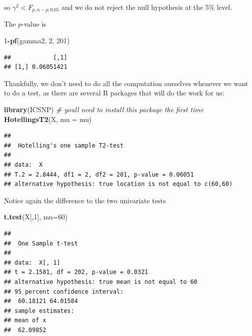\documentclass[
]{book}
\newenvironment{Shaded}{\begin{snugshade}}{\end{snugshade}}
\newcommand{\AttributeTok}[1]{\textcolor[rgb]{0.13,0.29,0.53}{#1}}
\newcommand{\CommentTok}[1]{\textcolor[rgb]{0.56,0.35,0.01}{\textit{#1}}}
\newcommand{\DecValTok}[1]{\textcolor[rgb]{0.00,0.00,0.81}{#1}}
\newcommand{\FunctionTok}[1]{\textcolor[rgb]{0.13,0.29,0.53}{\textbf{#1}}}
\newcommand{\NormalTok}[1]{#1}
\newcommand{\SpecialCharTok}[1]{\textcolor[rgb]{0.81,0.36,0.00}{\textbf{#1}}}
\theoremstyle{definition}
\theoremstyle{definition}
\theoremstyle{definition}
\theoremstyle{definition}
\theoremstyle{remark}
\begin{document}
so \(\gamma^2 < F_{p,n-p,0.05}\) and we do not reject the null hypothesis at the 5\% level.

The \(p\)-value is

\begin{Shaded}
\begin{Highlighting}[]
\DecValTok{1}\SpecialCharTok{{-}}\FunctionTok{pf}\NormalTok{(gamma2, }\DecValTok{2}\NormalTok{, }\DecValTok{201}\NormalTok{)}
\end{Highlighting}
\end{Shaded}

\begin{verbatim}
##            [,1]
## [1,] 0.06051421
\end{verbatim}

Thankfully, we don't need to do all the computation ourselves whenever we want to do a test, as there are several R packages that will do the work for us:

\begin{Shaded}
\begin{Highlighting}[]
\FunctionTok{library}\NormalTok{(ICSNP) }\CommentTok{\# you\textquotesingle{}ll need to install this package the first time}
\FunctionTok{HotellingsT2}\NormalTok{(X,  }\AttributeTok{mu =}\NormalTok{ mu)}
\end{Highlighting}
\end{Shaded}

\begin{verbatim}
## 
##  Hotelling's one sample T2-test
## 
## data:  X
## T.2 = 2.8444, df1 = 2, df2 = 201, p-value = 0.06051
## alternative hypothesis: true location is not equal to c(60,60)
\end{verbatim}

Notice again the difference to the two univariate tests

\begin{Shaded}
\begin{Highlighting}[]
\FunctionTok{t.test}\NormalTok{(X[,}\DecValTok{1}\NormalTok{], }\AttributeTok{mu=}\DecValTok{60}\NormalTok{)}
\end{Highlighting}
\end{Shaded}

\begin{verbatim}
## 
##  One Sample t-test
## 
## data:  X[, 1]
## t = 2.1581, df = 202, p-value = 0.0321
## alternative hypothesis: true mean is not equal to 60
## 95 percent confidence interval:
##  60.18121 64.01584
## sample estimates:
## mean of x 
##  62.09852
\end{verbatim}
\end{document}
